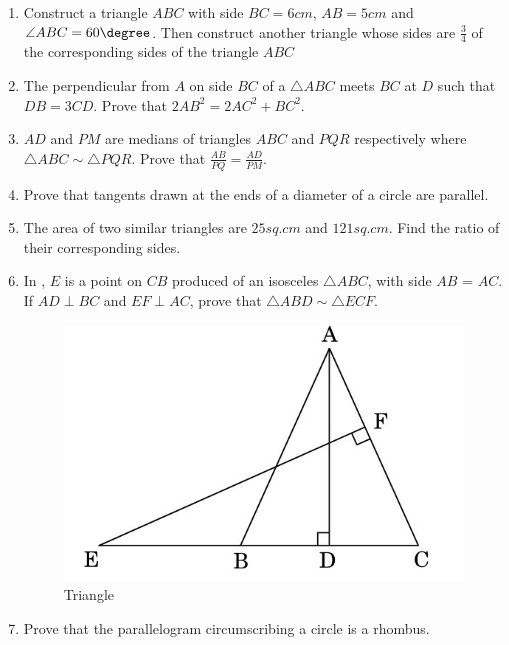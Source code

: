 \begin{enumerate}
\item Construct a triangle $ABC$ with side $BC = 6 cm$, $AB = 5 cm$ and $\angle ABC = 60\degree$. Then construct another triangle whose sides are $\frac{3}{4}$ of the corresponding sides of the triangle $ABC$

\item The perpendicular from $A$ on side $BC$ of a $\triangle ABC$ meets $BC$ at $D$ such that
$DB = 3CD$. Prove that $2AB^2 = 2AC^2 + BC^2$.

\item $AD$ and $PM$ are medians of triangles $ABC$ and $PQR$ respectively where
$\triangle ABC \sim \triangle PQR$. Prove that ${\frac {AB}{PQ}} = {\frac {AD}{PM}}$.

\item Prove that tangents drawn at the ends of a diameter of a circle are parallel.

\item The area of two similar triangles are $25 sq. cm$ and $121 sq. cm$. Find the
ratio of their corresponding sides.

\item In , $E$ is a point on $CB$ produced of an isosceles ${\triangle ABC}$, with side $AB$ = $AC$. If ${AD \perp  BC }$ and ${ EF \perp AC}$, prove that ${\triangle ABD{ \sim }\triangle ECF}$.
 \begin{figure}[H]
    \centering
    \includegraphics[width=\columnwidth]{figs/Figure_1.png}
    \caption{Triangle}
    \label{fig:Figppr-1}
\end{figure}

\item Prove that the parallelogram circumscribing a circle is a rhombus.


\end{enumerate}
